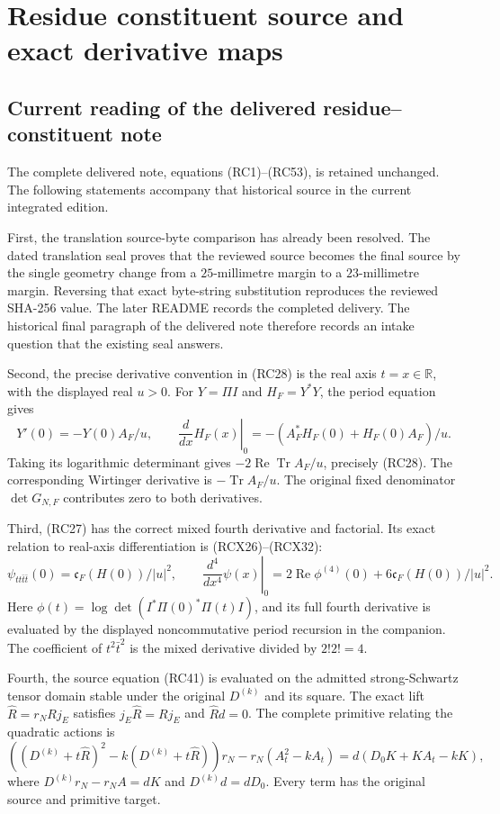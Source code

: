\begingroup

\section{Residue constituent source and exact derivative maps}


\subsection{Current reading of the delivered residue--constituent note}

The complete delivered note, equations (RC1)--(RC53), is retained
unchanged. The following statements accompany that historical source
in the current integrated edition.

First, the translation source-byte comparison has already been resolved.
The dated translation seal proves that the reviewed source becomes the
final source by the single geometry change from a \(25\)-millimetre
margin to a \(23\)-millimetre margin. Reversing that exact byte-string
substitution reproduces the reviewed SHA-256 value. The later README
records the completed delivery. The historical final paragraph of the
delivered note therefore records an intake question that the existing
seal answers.

Second, the precise derivative convention in (RC28) is the real
axis \(t=x\in\mathbb R\), with the displayed real \(u>0\).
For \(Y=\Pi I\) and \(H_F=Y^*Y\), the period equation gives
\[
 Y'(0)=-Y(0)A_F/u,\qquad
 \left.\frac{d}{dx}H_F(x)\right|_0
       =-(A_F^*H_F(0)+H_F(0)A_F)/u.
\]
Taking its logarithmic determinant gives
\(-2\operatorname{Re}\operatorname{Tr}A_F/u\), precisely (RC28).
The corresponding Wirtinger derivative is
\(-\operatorname{Tr}A_F/u\). The original fixed denominator
\(\det G_{N,F}\) contributes zero to both derivatives.

Third, (RC27) has the correct mixed fourth derivative and factorial.
Its exact relation to real-axis differentiation is (RCX26)--(RCX32):
\[
 \psi_{tt\bar t\bar t}(0)=\mathfrak c_F(H(0))/|u|^2,\qquad
 \left.\frac{d^4}{dx^4}\psi(x)\right|_0
   =2\operatorname{Re}\phi^{(4)}(0)
      +6\mathfrak c_F(H(0))/|u|^2 .
\]
Here \(\phi(t)=\log\det(I^*\Pi(0)^*\Pi(t)I)\), and its full
fourth derivative is evaluated by the displayed noncommutative
period recursion in the companion. The coefficient of
\(t^2\bar t^2\) is the mixed derivative divided by \(2!2!=4\).

Fourth, the source equation (RC41) is evaluated on the admitted
strong-Schwartz tensor domain stable under the original
\(D^{(k)}\) and its square. The exact lift
\(\widehat R=r_NRj_E\) satisfies
\(j_E\widehat R=Rj_E\) and \(\widehat R d=0\).
The complete primitive relating the quadratic actions is
\[
 ((D^{(k)}+t\widehat R)^2-k(D^{(k)}+t\widehat R))r_N
     -r_N(A_t^2-kA_t)
       =d(D_0K+KA_t-kK),
\]
where \(D^{(k)}r_N-r_NA=dK\) and \(D^{(k)}d=dD_0\).
Every term has the original source and primitive target.

